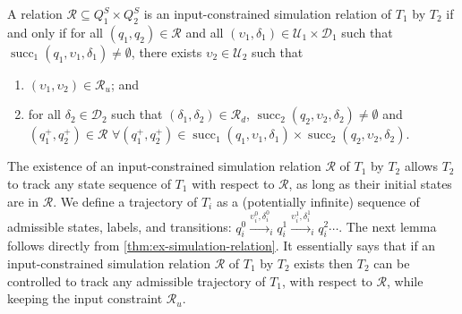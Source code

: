 \begin{definition}
  \label{thm:ex-simulation-relation}
  A relation $\mathcal{R} \subseteq Q^{S}_1 \times Q^{S}_2$ is an input-constrained simulation relation of $T_1$ by $T_2$ if and only if for all $(q_1, q_2) \in \mathcal{R}$ and all $(\upsilon_{1}, \delta_{1}) \in \mathcal{U}_{1} \times \mathcal{D}_{1}$ such that $\operatorname{succ}_{1} (q_{1}, \upsilon_{1}, \delta_{1}) \neq \emptyset$, there exists $\upsilon_{2} \in \mathcal{U}_{2}$ such that
    \begin{enumerate}
    \item $(\upsilon_{1}, \upsilon_{2}) \in \mathcal{R}_{u}$; and
    \item for all $\delta_{2} \in \mathcal{D}_{2}$ such that $(\delta_{1}, \delta_{2}) \in \mathcal{R}_{d}$, $\operatorname{succ}_{2} (q_{2}, \upsilon_{2}, \delta_{2}) \neq \emptyset$ and $(q_{1}^{+}, q_{2}^{+}) \in \mathcal{R}$ %
      $\forall (q_{1}^{+}, q_{2}^{+}) \in \operatorname{succ}_{1} (q_{1}, \upsilon_{1}, \delta_{1}) \times \operatorname{succ}_{2} (q_{2}, \upsilon_{2}, \delta_{2})$.
    \end{enumerate}
\end{definition}


The existence of an input-constrained simulation relation $\mathcal{R}$ of $T_{1}$ by $T_{2}$ allows $T_{2}$ to track any state sequence of $T_{1}$ with respect to $\mathcal{R}$, as long as their initial states are in $\mathcal{R}$.
We define a trajectory of $T_{i}$ as a (potentially infinite) sequence of admissible states, labels, and transitions: $q_{i}^{0} \xrightarrow{\upsilon_{i}^{0}, \delta_{i}^{0}}_{i} q_{i}^{1} \xrightarrow{\upsilon_{i}^{1}, \delta_{i}^{1}}_{i} q_{i}^{2} \cdots$.
The next lemma follows directly from \cref{thm:ex-simulation-relation}.
It essentially says that if an input-constrained simulation relation $\mathcal{R}$ of $T_{1}$ by $T_2$ exists then $T_{2}$ can be controlled to track any admissible trajectory of $T_{1}$, with respect to $\mathcal{R}$, while keeping the input constraint $\mathcal{R}_{u}$.

